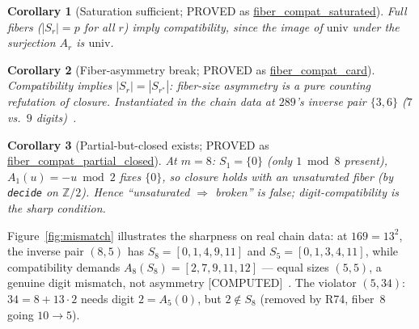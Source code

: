 \documentclass[11pt,a4paper]{article}
\newtheorem{corollary}{Corollary}
\theoremstyle{definition}
\begin{document}
\begin{corollary}[Saturation sufficient; PROVED as
  \url{fiber_compat_saturated}]
  Full fibers ($|S_r|=p$ for all $r$) imply compatibility, since the
  image of $\mathrm{univ}$ under the surjection $A_r$ is $\mathrm{univ}$.
\end{corollary}

\begin{corollary}[Fiber-asymmetry break; PROVED as
  \url{fiber_compat_card}]
  Compatibility implies $|S_r|=|S_{r^*}|$: fiber-size asymmetry is a pure
  counting refutation of closure. Instantiated in the chain data at
  $289$'s inverse pair $\{3,6\}$ ($7$ vs.\ $9$ digits)~\cite{D185}.
\end{corollary}

\begin{corollary}[Partial-but-closed exists; PROVED as
  \url{fiber_compat_partial_closed}]
  At $m=8$: $S_1=\{0\}$ (only $1\bmod8$ present), $A_1(u)=-u\bmod2$ fixes
  $\{0\}$, so closure holds with an unsaturated fiber (by
  \texttt{decide} on $\mathbb{Z}/2$). Hence ``unsaturated $\Rightarrow$
  broken'' is false; digit-compatibility is the sharp condition.
\end{corollary}

Figure~\ref{fig:mismatch} illustrates the sharpness on real chain data:
at $169=13^2$, the inverse pair $(8,5)$ has
$S_8=[0,1,4,9,11]$ and $S_5=[0,1,3,4,11]$, while compatibility demands
$A_8(S_8)=[2,7,9,11,12]$ --- equal sizes $(5,5)$, a genuine digit
mismatch, not asymmetry [COMPUTED]~\cite{D185}. The violator $(5,34)$:
$34=8+13\cdot2$ needs digit $2=A_5(0)$, but $2\notin S_8$ (removed by
R74, fiber~$8$ going $10\to5$).
\end{document}
